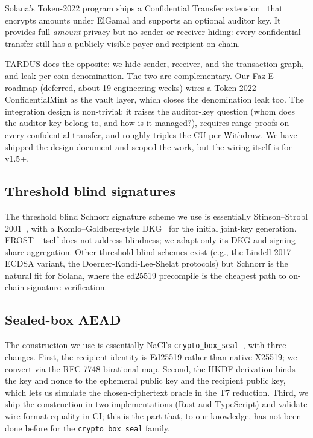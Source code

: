 Solana's Token-2022 program ships a Confidential Transfer extension~\cite{token2022confidential} that encrypts amounts under ElGamal and supports an optional auditor key. It provides full \emph{amount} privacy but no sender or receiver hiding: every confidential transfer still has a publicly visible payer and recipient on chain.

TARDUS does the opposite: we hide sender, receiver, and the transaction graph, and leak per-coin denomination. The two are complementary. Our Faz E roadmap (deferred, about 19 engineering weeks) wires a Token-2022 ConfidentialMint as the vault layer, which closes the denomination leak too. The integration design is non-trivial: it raises the auditor-key question (whom does the auditor key belong to, and how is it managed?), requires range proofs on every confidential transfer, and roughly triples the CU per Withdraw. We have shipped the design document and scoped the work, but the wiring itself is for v1.5+.

\subsection{Threshold blind signatures}

The threshold blind Schnorr signature scheme we use is essentially Stinson--Strobl 2001~\cite{stinsonstrobl2001}, with a Komlo--Goldberg-style DKG~\cite{komlogoldberg2020} for the initial joint-key generation. FROST~\cite{komlogoldberg2020} itself does not address blindness; we adapt only its DKG and signing-share aggregation. Other threshold blind schemes exist (e.g., the Lindell 2017 ECDSA variant, the Doerner-Kondi-Lee-Shelat protocols) but Schnorr is the natural fit for Solana, where the ed25519 precompile is the cheapest path to on-chain signature verification.

\subsection{Sealed-box AEAD}

The construction we use is essentially NaCl's \texttt{crypto\_box\_seal}~\cite{nacl}, with three changes. First, the recipient identity is Ed25519 rather than native X25519; we convert via the RFC 7748 birational map. Second, the HKDF derivation binds the key and nonce to the ephemeral public key and the recipient public key, which lets us simulate the chosen-ciphertext oracle in the T7 reduction. Third, we ship the construction in two implementations (Rust and TypeScript) and validate wire-format equality in CI; this is the part that, to our knowledge, has not been done before for the \texttt{crypto\_box\_seal} family.

